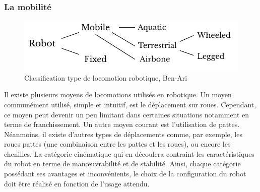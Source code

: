         \subsubsection{La mobilité}
            \begin{figure}[!h]
                    \centering
                    \includegraphics[width=0.8\linewidth]{Figures/Mondada-classification.pdf}
                    \caption{Classification type de locomotion robotique, Ben-Ari~}
                    \label{fig:Classification}
            \end{figure}\par%
                Il existe plusieurs moyens de locomotions utilisés en robotique. Un moyen communément utilisé, simple et intuitif, est le déplacement sur roues. Cependant, ce moyen peut devenir un peu limitant dans certaines situations notamment en terme de franchissement. Un autre moyen courant est l'utilisation de pattes. Néanmoins, il existe d'autres types de déplacements comme, par exemple, les roues pattes (une combinaison entre les pattes et les roues), ou encore les chenilles.
                La catégorie cinématique qui en découlera contraint les caractéristiques du robot en terme de manœuvrabilité et de stabilité. Ainsi, chaque catégorie possédant ses avantages et inconvénients, le choix de la configuration du robot doit être réalisé en fonction de l'usage attendu.
